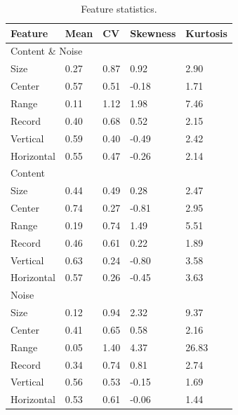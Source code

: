 \begin{table}[h]
\centering
\caption{Feature statistics.}
\label{tab:stat}
\begin{tabular}{ | l | l | l | l | l |}
\hline
Feature & Mean & CV & Skewness & Kurtosis \\
\hline
\multicolumn{5}{|l|}{Content \& Noise} \\
\hline
Size & 0.27 & 0.87 & 0.92 & 2.90 \\
Center & 0.57 & 0.51 & -0.18 & 1.71 \\
Range & 0.11 & 1.12 & 1.98 & 7.46 \\
Record & 0.40 & 0.68 & 0.52 & 2.15 \\
Vertical & 0.59 & 0.40 & -0.49 & 2.42 \\
Horizontal & 0.55 & 0.47 & -0.26 & 2.14 \\
\hline
\multicolumn{5}{|l|}{Content} \\
\hline
Size & 0.44 & 0.49 & 0.28 & 2.47 \\
Center & 0.74 & 0.27 & -0.81 & 2.95 \\
Range & 0.19 & 0.74 & 1.49 & 5.51 \\
Record & 0.46 & 0.61 & 0.22 & 1.89 \\
Vertical & 0.63 & 0.24 & -0.80 & 3.58 \\
Horizontal & 0.57 & 0.26 & -0.45 & 3.63 \\
\hline
\multicolumn{5}{|l|}{Noise} \\
\hline
Size & 0.12 & 0.94 & 2.32 & 9.37 \\
Center & 0.41 & 0.65 & 0.58 & 2.16 \\
Range & 0.05 & 1.40 & 4.37 & 26.83 \\
Record & 0.34 & 0.74 & 0.81 & 2.74 \\
Vertical & 0.56 & 0.53 & -0.15 & 1.69 \\
Horizontal & 0.53 & 0.61 & -0.06 & 1.44 \\
\hline
\end{tabular}
\end{table}

